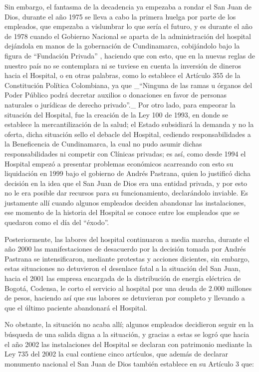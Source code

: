 Sin embargo, el fantasma de la decadencia ya empezaba a rondar el San Juan de Dios, durante el año 1975 se lleva a cabo la primera huelga por parte de los empleados, que empezaba a vislumbrar lo que sería el futuro, y es durante el año de 1978 cuando el Gobierno Nacional se aparta de la administración del hospital dejándola en manos de la gobernación de Cundinamarca, cobijándolo bajo la figura de “Fundación Privada” , haciendo que con esto, que en la nuevas reglas de nuestro país no se contemplara ni se tuviese en cuenta la inversión de dineros hacia el Hospital, o en otras palabras, como lo establece el Artículo 355 de la Constitución Política Colombiana, ya que _“Ninguna de las ramas u órganos del Poder Público podrá decretar auxilios o donaciones en favor de personas naturales o jurídicas de derecho privado”._ Por otro lado, para empeorar la situación del Hospital, fue la creación de la Ley 100 de 1993, en donde se establece la mercantilización de la salud; el Estado subsidiará la demanda y no la oferta, dicha situación sello el debacle del Hospital, cediendo responsabilidades a la Beneficencia de Cundinamarca, la cual no pudo asumir dichas responsabilidades ni competir con Clínicas privadas; es así, como desde 1994 el Hospital empezó a presentar problemas económicos acarreando con esto su liquidación en 1999 bajo el gobierno de Andrés Pastrana, quien lo justificó dicha decisión en la idea que el San Juan de Dios era una entidad privada, y por esto no le era posible dar recursos para su funcionamiento, declarándolo inviable. Es justamente allí cuando algunos empleados deciden abandonar las instalaciones, ese momento de la historia del Hospital se conoce entre los empleados que se quedaron como el día del “éxodo”.

Posteriormente, las labores del hospital continuaron a media marcha, durante el año 2000 las manifestaciones de desacuerdo por la decisión tomada por Andrés Pastrana se intensificaron, mediante protestas y acciones dicientes, sin embargo, estas situaciones no detuvieron el desenlace fatal a la situación del San Juan, hacia el 2001 las empresa encargada de la distribución de energía eléctrica de Bogotá, Codensa, le corto el servicio al hospital por una deuda de 2.000 millones de pesos, haciendo así que sus labores se detuvieran por completo y llevando a que el último paciente abandonará el Hospital.

No obstante, la situación no acaba allí; algunos empleados decidieron seguir en la búsqueda de una salida digna a la situación, y gracias a estas se logró que hacia el año 2002 las instalaciones del Hospital se declaran con patrimonio mediante la Ley 735 del 2002 la cual contiene cinco artículos, que además de declarar monumento nacional el San Juan de Dios también establece en su Artículo 3 que:

